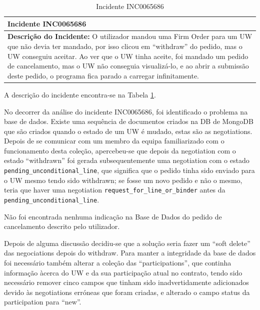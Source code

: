             \begin{table}[H] %
                \centering
                \begin{tabularx}{1\textwidth}{|>{\raggedright\arraybackslash}X|}
                    \hline
                    \rowcolor{lightgray}
                    \textbf{Incidente INC0065686} \\
                    \hline
                    \rowcolor{lightgray!20}
                
                    \textbf{Descrição do Incidente:} O utilizador mandou uma Firm Order para um UW que não devia ter mandado, por isso clicou em ``withdraw'' do pedido, mas o UW conseguiu aceitar. Ao ver que o UW tinha aceite, foi mandado um pedido de cancelamento, mas o UW não conseguia visualizá-lo, e ao abrir a submissão deste pedido, o programa fica parado a carregar infinitamente.

                    \\
                    \hline
                \end{tabularx}
                \caption{Incidente INC0065686}\label{table:incINC0065686}
            \end{table}

            A descrição do incidente encontra-se na Tabela \ref{table:incINC0065686}.

            No decorrer da análise do incidente INC0065686, foi identificado o problema na base de dados. Existe uma sequência de documentos criados na DB de MongoDB que são criados quando o estado de um UW é mudado, estas são as negotiations. Depois de se comunicar com um membro da equipa familiarizado com o funcionamento desta coleção, apercebeu-se que depois da negotiation com o estado ``withdrawn'' foi gerada subsequentemente uma negotiation com o estado \texttt{pending\_unconditional\_line}, que significa que o pedido tinha sido enviado para o UW mesmo tendo sido withdrawn; se fosse um novo pedido e não o mesmo, teria que haver uma negotiation \texttt{request\_for\_line\_or\_binder} antes da \texttt{pending\_unconditional\_line}.

            Não foi encontrada nenhuma indicação na Base de Dados do pedido de cancelamento descrito pelo utilizador.

            Depois de alguma discussão decidiu-se que a solução seria fazer um ``soft delete'' das negociations depois do withdraw. Para manter a integridade da base de dados foi necessário também alterar a coleção das ``participations'', que continha informação àcerca do UW e da sua participação atual no contrato, tendo sido necessário remover cinco campos que tinham sido inadvertidamente adicionados devido às negotiations erróneas que foram criadas, e alterado o campo status da participation para ``new''.
            
